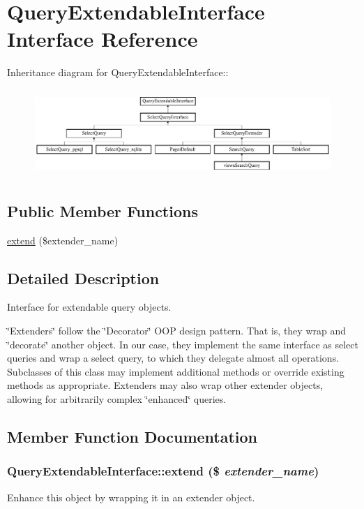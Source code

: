 \hypertarget{interfaceQueryExtendableInterface}{
\section{QueryExtendableInterface Interface Reference}
\label{interfaceQueryExtendableInterface}
}
Inheritance diagram for QueryExtendableInterface::\begin{figure}[H]
\begin{center}
\leavevmode
\includegraphics[height=3.33333cm]{interfaceQueryExtendableInterface}
\end{center}
\end{figure}
\subsection*{Public Member Functions}
\begin{DoxyCompactItemize}
\item 
\hyperlink{interfaceQueryExtendableInterface_a247fadddaaecd7806d493ba85c388e65}{extend} (\$extender\_\-name)
\end{DoxyCompactItemize}


\subsection{Detailed Description}
Interface for extendable query objects.

\char`\"{}Extenders\char`\"{} follow the \char`\"{}Decorator\char`\"{} OOP design pattern. That is, they wrap and \char`\"{}decorate\char`\"{} another object. In our case, they implement the same interface as select queries and wrap a select query, to which they delegate almost all operations. Subclasses of this class may implement additional methods or override existing methods as appropriate. Extenders may also wrap other extender objects, allowing for arbitrarily complex \char`\"{}enhanced\char`\"{} queries. 

\subsection{Member Function Documentation}
\hypertarget{interfaceQueryExtendableInterface_a247fadddaaecd7806d493ba85c388e65}{
\subsubsection[{extend}]{\setlength{\rightskip}{0pt plus 5cm}QueryExtendableInterface::extend (\$ {\em extender\_\-name})}}
\label{interfaceQueryExtendableInterface_a247fadddaaecd7806d493ba85c388e65}
Enhance this object by wrapping it in an extender object.


